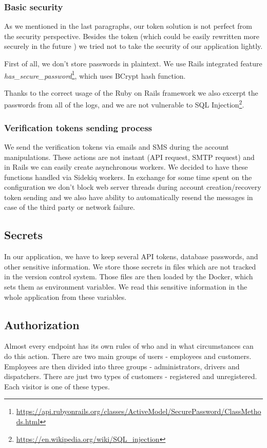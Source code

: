 \subsubsection{Basic security}
	As we mentioned in the last paragraphs, our token solution is not perfect from the security perspective. Besides the token (which could be easily rewritten more securely in the future ) we tried not to take the security of our application lightly.
	
	First of all, we don't store passwords in plaintext. We use Rails integrated feature \textit{has\_secure\_password}\footnote{\url{https://api.rubyonrails.org/classes/ActiveModel/SecurePassword/ClassMethods.html}}, which uses BCrypt hash function.
	
	Thanks to the correct usage of the Ruby on Rails framework we also excerpt the passwords from all of the logs, and we are not vulnerable to SQL Injection\footnote{\url{https://en.wikipedia.org/wiki/SQL\_injection}}.

\subsubsection{Verification tokens sending process}
	We send the verification tokens via emails and SMS during the account manipulations. These actions are not instant (API request, SMTP request) and in Rails we can easily create asynchronous workers. We decided to have these functions handled via Sidekiq workers. In exchange for some time spent on the configuration we don't block web server threads during account creation/recovery token sending and we also have ability to automatically resend the messages in case of the third party or network failure.

\subsection{Secrets}
	In our application, we have to keep several API tokens, database passwords, and other sensitive information. We store those secrets in files which are not tracked in the version control system. Those files are then loaded by the Docker, which sets them as environment variables. We read this sensitive information in the whole application from these variables.  

\subsection{Authorization}
Almost every endpoint has its own rules of who and in what circumstances can do this action. There are two main groups of users - employees and customers. Employees are then divided into three groups - administrators, drivers and dispatchers. There are just two types of customers - registered and unregistered. Each visitor is one of these types.

